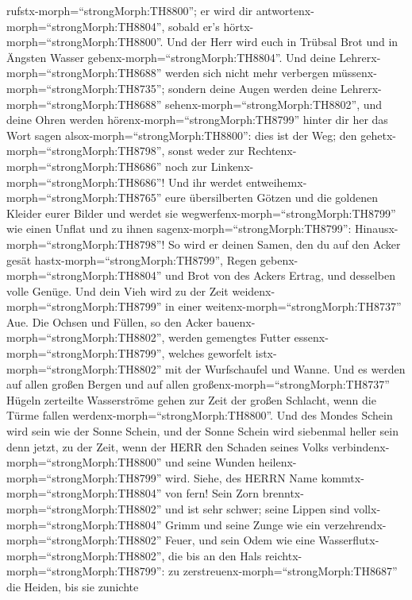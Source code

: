 rufstx-morph=``strongMorph:TH8800''; er wird dir
antwortenx-morph=``strongMorph:TH8804'', sobald er's
hörtx-morph=``strongMorph:TH8800''.  Und der Herr wird euch
in Trübsal Brot und in Ängsten Wasser
gebenx-morph=``strongMorph:TH8804''. Und deine
Lehrerx-morph=``strongMorph:TH8688'' werden sich nicht mehr verbergen
müssenx-morph=``strongMorph:TH8735''; sondern deine Augen werden deine
Lehrerx-morph=``strongMorph:TH8688''
sehenx-morph=``strongMorph:TH8802'',  und deine Ohren
werden hörenx-morph=``strongMorph:TH8799'' hinter dir her das Wort sagen
alsox-morph=``strongMorph:TH8800'': dies ist der Weg; den
gehetx-morph=``strongMorph:TH8798'', sonst weder zur
Rechtenx-morph=``strongMorph:TH8686'' noch zur
Linkenx-morph=``strongMorph:TH8686''!  Und ihr werdet
entweihemx-morph=``strongMorph:TH8765'' eure übersilberten Götzen und
die goldenen Kleider eurer Bilder und werdet sie
wegwerfenx-morph=``strongMorph:TH8799'' wie einen Unflat und zu ihnen
sagenx-morph=``strongMorph:TH8799'':
Hinausx-morph=``strongMorph:TH8798''!  So wird er deinen
Samen, den du auf den Acker gesät hastx-morph=``strongMorph:TH8799'',
Regen gebenx-morph=``strongMorph:TH8804'' und Brot von des Ackers
Ertrag, und desselben volle Genüge. Und dein Vieh wird zu der Zeit
weidenx-morph=``strongMorph:TH8799'' in einer
weitenx-morph=``strongMorph:TH8737'' Aue.  Die Ochsen und
Füllen, so den Acker bauenx-morph=``strongMorph:TH8802'', werden
gemengtes Futter essenx-morph=``strongMorph:TH8799'', welches geworfelt
istx-morph=``strongMorph:TH8802'' mit der Wurfschaufel und Wanne.
 Und es werden auf allen großen Bergen und auf allen
großenx-morph=``strongMorph:TH8737'' Hügeln zerteilte Wasserströme gehen
zur Zeit der großen Schlacht, wenn die Türme fallen
werdenx-morph=``strongMorph:TH8800''.  Und des Mondes
Schein wird sein wie der Sonne Schein, und der Sonne Schein wird
siebenmal heller sein denn jetzt, zu der Zeit, wenn der HERR den Schaden
seines Volks verbindenx-morph=``strongMorph:TH8800'' und seine Wunden
heilenx-morph=``strongMorph:TH8799'' wird.  Siehe, des
HERRN Name kommtx-morph=``strongMorph:TH8804'' von fern! Sein Zorn
brenntx-morph=``strongMorph:TH8802'' und ist sehr schwer; seine Lippen
sind vollx-morph=``strongMorph:TH8804'' Grimm und seine Zunge wie ein
verzehrendx-morph=``strongMorph:TH8802'' Feuer,  und sein
Odem wie eine Wasserflutx-morph=``strongMorph:TH8802'', die bis an den
Hals reichtx-morph=``strongMorph:TH8799'': zu
zerstreuenx-morph=``strongMorph:TH8687'' die Heiden, bis sie zunichte
